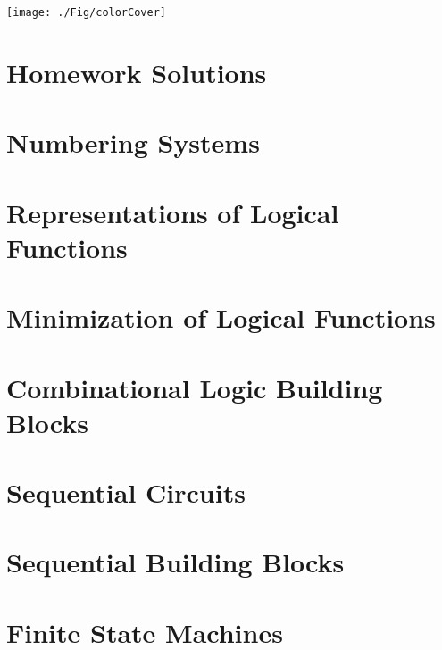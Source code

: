 \documentclass[letterpaper, 10pt]{memoir}
\begin{document}
\frontmatter
\title{}
\texttt{[image: ./Fig/colorCover]}
\maketitle


\tableofcontents
\showanswers

\mainmatter
\chapter*{Homework Solutions}

\chapter{Numbering Systems}


\chapter{Representations of Logical Functions}


\chapter{Minimization of Logical Functions}


\chapter{Combinational Logic Building Blocks}


\chapter{Sequential Circuits}


\chapter{Sequential Building Blocks}


\chapter{Finite State Machines}

\end{document}
